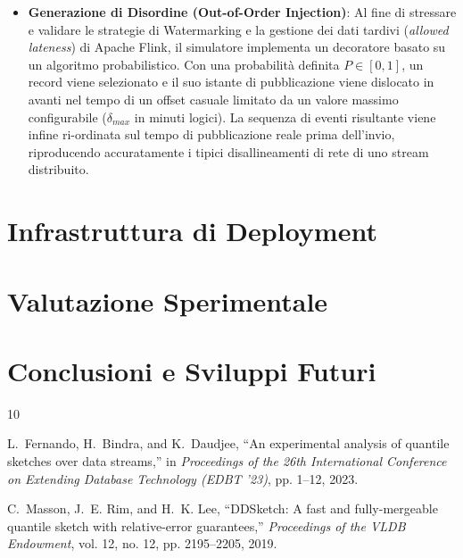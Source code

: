 \documentclass[conference]{IEEEtran}
\begin{document}
\begin{itemize}
    \item \textbf{Generazione di Disordine (Out-of-Order Injection)}: Al fine di stressare e validare le strategie di Watermarking e la gestione dei dati tardivi (\textit{allowed lateness}) di Apache Flink, il simulatore implementa un decoratore basato su un algoritmo probabilistico. Con una probabilità definita $P \in [0, 1]$, un record viene selezionato e il suo istante di pubblicazione viene dislocato in avanti nel tempo di un offset casuale limitato da un valore massimo configurabile ($\delta_{max}$ in minuti logici). La sequenza di eventi risultante viene infine ri-ordinata sul tempo di pubblicazione reale prima dell'invio, riproducendo accuratamente i tipici disallineamenti di rete di uno stream distribuito.
\end{itemize}


\section{Infrastruttura di Deployment}\label{sec:deployment_infrastructure}


\section{Valutazione Sperimentale}\label{sec:experimental_evaluation}


\section{Conclusioni e Sviluppi Futuri}\label{sec:conclusions_future_work}

\begin{thebibliography}{10}

L.~Fernando, H.~Bindra, and K.~Daudjee, ``An experimental analysis of quantile sketches over data streams,'' in \emph{Proceedings of the 26th International Conference on Extending Database Technology (EDBT '23)}, pp. 1--12, 2023.

C.~Masson, J.~E. Rim, and H.~K. Lee, ``DDSketch: A fast and fully-mergeable quantile sketch with relative-error guarantees,'' \emph{Proceedings of the VLDB Endowment}, vol. 12, no. 12, pp. 2195--2205, 2019.

\end{thebibliography}
\end{document}
